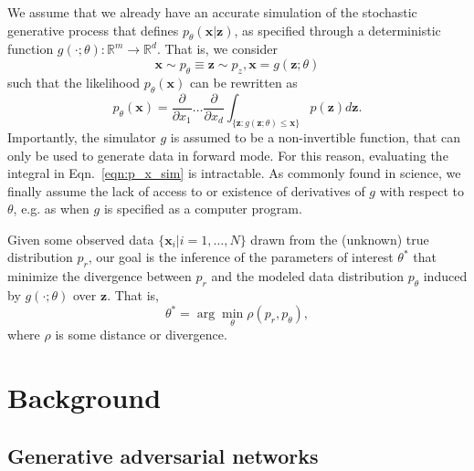 \documentclass[twocolumn,superscriptaddress,aps]{revtex4-1}
\theoremstyle{plain}
\begin{document}
We assume that we already have an accurate simulation of the stochastic
generative process that defines $p_\theta(\mathbf{x}|\mathbf{z})$, as
specified through a deterministic function $g(\cdot; \theta) : \mathbb{R}^m \to
\mathbb{R}^d$. That is, we consider
\begin{equation}\label{eqn:p_theta}
    \mathbf{x} \sim p_\theta \equiv \mathbf{z} \sim p_z, \mathbf{x} = g(\mathbf{z}; \theta)
\end{equation}
such that the likelihood $p_\theta(\mathbf{x})$ can be rewritten as
\begin{equation}\label{eqn:p_x_sim}
    p_\theta(\mathbf{x}) = \frac{\partial}{\partial x_1} \dots \frac{\partial}{\partial x_d} \int_{\{\mathbf{z}:g(\mathbf{z};\theta) \leq \mathbf{x}\}} p(\mathbf{z}) d\mathbf{z}.
\end{equation}
Importantly, the simulator $g$ is assumed to be a non-invertible function, that can only be
used to generate data in forward mode. For this reason, evaluating the integral
in Eqn.~\ref{eqn:p_x_sim} is intractable. As commonly found
in science, we finally assume the lack of access to or existence of derivatives of $g$ with respect to $\theta$,
e.g. as when $g$ is specified as a computer program.

Given some observed data $\{ \mathbf{x}_i | i=1, \dots, N \}$ drawn from the
(unknown) true distribution $p_r$, our goal is the inference of the parameters
of interest $\theta^*$ that minimize the divergence between $p_r$ and
the modeled data distribution $p_\theta$ induced by $g(\cdot;
\theta)$ over $\mathbf{z}$. That is,
\begin{equation}
    \theta^* = \arg \min_\theta \rho(p_r, p_\theta),
\end{equation}
where $\rho$ is some distance or divergence.



\section{Background}

\subsection{Generative adversarial networks}
\end{document}
